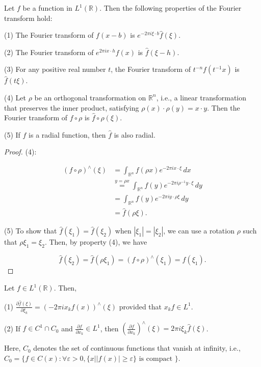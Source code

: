 \begin{proposition}
    Let $f$ be a function in $L^{1}(\mathbb{R})$. Then the following properties of the Fourier transform hold:

(1) The Fourier transform of $f(x-b)$ is $e^{-2 \pi i \xi \cdot b} \hat{f}(\xi)$.

(2) The Fourier transform of $e^{2 \pi i x \cdot h} f(x)$ is $\hat{f}(\xi-h)$.

(3) For any positive real number $t$, the Fourier transform of $t^{-n} f(t^{-1} x)$ is $\hat{f}(t \xi)$.

(4) Let $\rho$ be an orthogonal transformation on $\mathbb{R}^n$, i.e., a linear transformation that preserves the inner product, satisfying $\rho(x) \cdot \rho(y) = x \cdot y$. Then the Fourier transform of $f \circ \rho$ is $\hat{f} \circ \rho(\xi)$.

(5) If $f$ is a radial function, then $\hat{f}$ is also radial.
\end{proposition}
\begin{proof}
(4):

    $$\begin{aligned}
(f \circ \rho)^{\wedge}(\xi) &= \int_{\mathbb{R}^n} f(\rho x) e^{-2 \pi i x \cdot \xi} \, dx \\
&\overset{y = \rho x}{=} \int_{\mathbb{R}^n} f(y) e^{-2 \pi i \rho^{-1} y \cdot \xi} \, dy \\
&= \int_{\mathbb{R}^n} f(y) e^{-2 \pi i y \cdot \rho \xi} \, dy \\
&= \hat{f}(\rho \xi).
\end{aligned}$$

(5) To show that $\hat{f}(\xi_1) = \hat{f}(\xi_2)$ when $|\xi_1| = |\xi_2|$, we can use a rotation $\rho$ such that $\rho \xi_1 = \xi_2$. Then, by property (4), we have

$$\hat{f}(\xi_2) = \hat{f}(\rho \xi_1) = (f \circ \rho)^{\wedge}(\xi_1) = \hat{f}(\xi_1).$$
\end{proof}
\begin{theorem}
    Let $f \in L^{1}(\mathbb{R})$. Then,

(1) $\frac{\partial \hat{f}(\xi)}{\partial \xi_k}=\left(-2 \pi i x_k f(x)\right)^{\wedge}(\xi)$ provided that $x_k f \in L^1$.

(2) If $f \in C^{1} \cap C_0$ and $\frac{\partial f}{\partial x_k} \in L^1$, then $\left(\frac{\partial f}{\partial x_k}\right)^{\wedge}(\xi)=2 \pi i \xi_k \hat{f}(\xi)$.

Here, $C_0$ denotes the set of continuous functions that vanish at infinity, i.e., $C_0=\{f \in C(x): \forall \varepsilon>0, \{x | |f(x)| \geqslant \varepsilon\} \text{ is compact }\}$.
\end{theorem}
